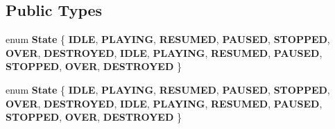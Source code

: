 \subsection*{Public Types}
\begin{DoxyCompactItemize}
\item 
\mbox{\label{classcocos2d_1_1experimental_1_1Track_a9135e491aa98eec81e8ce77c485cf0b1}} 
enum {\bfseries State} \{ \newline
{\bfseries I\+D\+LE}, 
{\bfseries P\+L\+A\+Y\+I\+NG}, 
{\bfseries R\+E\+S\+U\+M\+ED}, 
{\bfseries P\+A\+U\+S\+ED}, 
\newline
{\bfseries S\+T\+O\+P\+P\+ED}, 
{\bfseries O\+V\+ER}, 
{\bfseries D\+E\+S\+T\+R\+O\+Y\+ED}, 
{\bfseries I\+D\+LE}, 
\newline
{\bfseries P\+L\+A\+Y\+I\+NG}, 
{\bfseries R\+E\+S\+U\+M\+ED}, 
{\bfseries P\+A\+U\+S\+ED}, 
{\bfseries S\+T\+O\+P\+P\+ED}, 
\newline
{\bfseries O\+V\+ER}, 
{\bfseries D\+E\+S\+T\+R\+O\+Y\+ED}
 \}
\item 
\mbox{\label{classcocos2d_1_1experimental_1_1Track_a9135e491aa98eec81e8ce77c485cf0b1}} 
enum {\bfseries State} \{ \newline
{\bfseries I\+D\+LE}, 
{\bfseries P\+L\+A\+Y\+I\+NG}, 
{\bfseries R\+E\+S\+U\+M\+ED}, 
{\bfseries P\+A\+U\+S\+ED}, 
\newline
{\bfseries S\+T\+O\+P\+P\+ED}, 
{\bfseries O\+V\+ER}, 
{\bfseries D\+E\+S\+T\+R\+O\+Y\+ED}, 
{\bfseries I\+D\+LE}, 
\newline
{\bfseries P\+L\+A\+Y\+I\+NG}, 
{\bfseries R\+E\+S\+U\+M\+ED}, 
{\bfseries P\+A\+U\+S\+ED}, 
{\bfseries S\+T\+O\+P\+P\+ED}, 
\newline
{\bfseries O\+V\+ER}, 
{\bfseries D\+E\+S\+T\+R\+O\+Y\+ED}
 \}
\end{DoxyCompactItemize}
